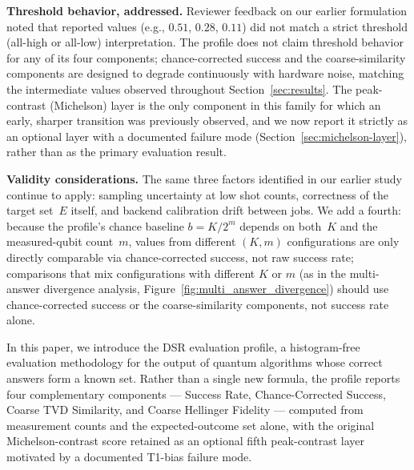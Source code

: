 \textbf{Threshold behavior, addressed.} Reviewer feedback on our earlier formulation noted that reported values (e.g., $0.51$, $0.28$, $0.11$) did not match a strict threshold (all-high or all-low) interpretation. The profile does not claim threshold behavior for any of its four components; chance-corrected success and the coarse-similarity components are designed to degrade continuously with hardware noise, matching the intermediate values observed throughout Section~\ref{sec:results}. The peak-contrast (Michelson) layer is the only component in this family for which an early, sharper transition was previously observed, and we now report it strictly as an optional layer with a documented failure mode (Section~\ref{sec:michelson-layer}), rather than as the primary evaluation result.

\textbf{Validity considerations.} The same three factors identified in our earlier study continue to apply: sampling uncertainty at low shot counts, correctness of the target set~$E$ itself, and backend calibration drift between jobs. We add a fourth: because the profile's chance baseline $b=K/2^m$ depends on both~$K$ and the measured-qubit count~$m$, values from different $(K, m)$ configurations are only directly comparable via chance-corrected success, not raw success rate; comparisons that mix configurations with different $K$ or $m$ (as in the multi-answer divergence analysis, Figure~\ref{fig:multi_answer_divergence}) should use chance-corrected success or the coarse-similarity components, not success rate alone.



In this paper, we introduce the DSR evaluation profile, a histogram-free evaluation methodology for the output of quantum algorithms whose correct answers form a known set. Rather than a single new formula, the profile reports four complementary components --- Success Rate, Chance-Corrected Success, Coarse TVD Similarity, and Coarse Hellinger Fidelity --- computed from measurement counts and the expected-outcome set alone, with the original Michelson-contrast score retained as an optional fifth peak-contrast layer motivated by a documented T1-bias failure mode.

